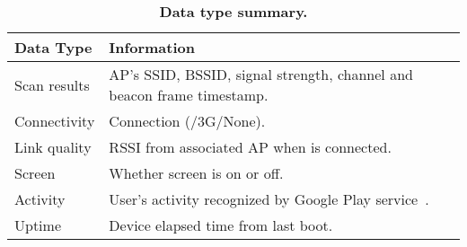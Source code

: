 \begin{table}[t]
  \centering
  \begin{tabularx}{0.48\textwidth}{lX}
    \toprule
    \textbf{Data Type} & \textbf{Information} \\
    \toprule
    Scan results & AP's SSID, BSSID, signal strength, channel and
    beacon frame timestamp. \\
    Connectivity & Connection (\wifi{}/3G/None). \\
    Link quality & RSSI from associated AP when \wifi{} is connected.\\
    Screen & Whether screen is on or off. \\
    Activity & User's activity recognized by Google Play service~\cite{androidactivity}.\\
    Uptime & Device elapsed time from last boot. \\
    \bottomrule
  \end{tabularx}
  \caption{\textbf{Data type summary.}}
  \label{tab:data}
\end{table}
